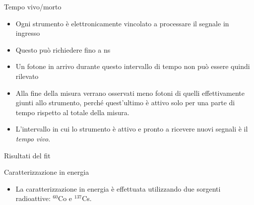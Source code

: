 \documentclass [xcolor=svgnames] {beamer}
\begin{document}
\begin{frame}{Tempo vivo/morto}
	\begin{itemize}
		\item Ogni strumento è elettronicamente vincolato a processare il segnale in ingresso
		\item Questo può richiedere fino a ns
		\item Un fotone in arrivo durante questo intervallo di tempo non può essere quindi rilevato
		\item Alla fine della misura verrano osservati meno fotoni di quelli effettivamente giunti allo strumento, perché quest'ultimo è attivo solo per una parte di tempo rispetto al totale della misura.
		\item L'intervallo in cui lo strumento è attivo e pronto a ricevere nuovi segnali è il \emph{tempo vivo}.
	\end{itemize}
\end{frame}
\begin{frame}{Risultati del fit}
	\begin{table}[ht]
		\centering
	\end{table}
\end{frame}	

\begin{frame}{Caratterizzazione in energia}
	\begin{itemize}
			\item La caratterizzazione in energia è effettuata utilizzando due sorgenti radioattive: $^{60}$Co e $^{137}$Cs.
		\end{itemize}
\end{frame}
\end{document}
